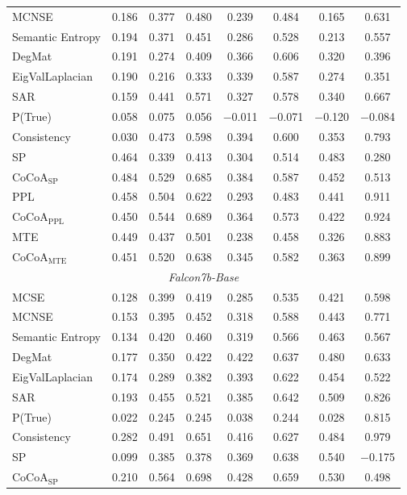 \documentclass[11pt]{article}
\begin{document}
\begin{table}[htbp]
{\begin{tabular}{l ccccccc}
MCNSE & 0.186 & 0.377 & 0.480 & 0.239 & 0.484 & 0.165 & 0.631 \\
Semantic Entropy & 0.194 & 0.371 & 0.451 & 0.286 & 0.528 & 0.213 & 0.557 \\
DegMat & 0.191 & 0.274 & 0.409 & 0.366 & 0.606 & 0.320 & 0.396 \\
EigValLaplacian & 0.190 & 0.216 & 0.333 & 0.339 & 0.587 & 0.274 & 0.351 \\
SAR & 0.159 & 0.441 & 0.571 & 0.327 & 0.578 & 0.340 & 0.667 \\
P(True) & 0.058 & 0.075 & 0.056 & $-$0.011 & $-$0.071 & $-$0.120 & $-$0.084 \\
Consistency & 0.030 & 0.473 & 0.598 & 0.394 & 0.600 & 0.353 & 0.793 \\
SP & 0.464 & 0.339 & 0.413 & 0.304 & 0.514 & 0.483 & 0.280 \\
CoCoA$_{\mathrm{SP}}$ & 0.484 & 0.529 & 0.685 & 0.384 & 0.587 & 0.452 & 0.513 \\
PPL & 0.458 & 0.504 & 0.622 & 0.293 & 0.483 & 0.441 & 0.911 \\
CoCoA$_{\mathrm{PPL}}$ & 0.450 & 0.544 & 0.689 & 0.364 & 0.573 & 0.422 & 0.924 \\
MTE & 0.449 & 0.437 & 0.501 & 0.238 & 0.458 & 0.326 & 0.883 \\
CoCoA$_{\mathrm{MTE}}$ & 0.451 & 0.520 & 0.638 & 0.345 & 0.582 & 0.363 & 0.899 \\
\midrule
\multicolumn{8}{c}{\textit{Falcon7b-Base}} \\
\midrule
MCSE & 0.128 & 0.399 & 0.419 & 0.285 & 0.535 & 0.421 & 0.598 \\
MCNSE & 0.153 & 0.395 & 0.452 & 0.318 & 0.588 & 0.443 & 0.771 \\
Semantic Entropy & 0.134 & 0.420 & 0.460 & 0.319 & 0.566 & 0.463 & 0.567 \\
DegMat & 0.177 & 0.350 & 0.422 & 0.422 & 0.637 & 0.480 & 0.633 \\
EigValLaplacian & 0.174 & 0.289 & 0.382 & 0.393 & 0.622 & 0.454 & 0.522 \\
SAR & 0.193 & 0.455 & 0.521 & 0.385 & 0.642 & 0.509 & 0.826 \\
P(True) & 0.022 & 0.245 & 0.245 & 0.038 & 0.244 & 0.028 & 0.815 \\
Consistency & 0.282 & 0.491 & 0.651 & 0.416 & 0.627 & 0.484 & 0.979 \\
SP & 0.099 & 0.385 & 0.378 & 0.369 & 0.638 & 0.540 & $-$0.175 \\
CoCoA$_{\mathrm{SP}}$ & 0.210 & 0.564 & 0.698 & 0.428 & 0.659 & 0.530 & 0.498 \\

\end{tabular}}
\end{table}
\end{document}
